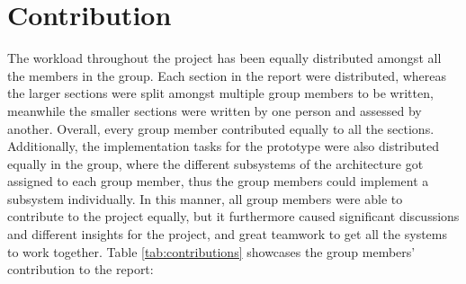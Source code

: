 \section{Contribution}
The workload throughout the project has been equally distributed amongst all the members in the group. Each section in the report were distributed, whereas the larger sections were split amongst multiple group members to be written, meanwhile the smaller sections were written by one person and assessed by another. Overall, every group member contributed equally to all the sections. Additionally, the implementation tasks for the prototype were also distributed equally in the group, where the different subsystems of the architecture got assigned to each group member, thus the group members could implement a subsystem individually. In this manner, all group members were able to contribute to the project equally, but it furthermore caused significant discussions and different insights for the project, and great teamwork to get all the systems to work together. Table \ref{tab:contributions} showcases the group members' contribution to the report:


\begin{table}[htbp]
\caption{Contributions}
\label{tab:contributions}
\end{table}